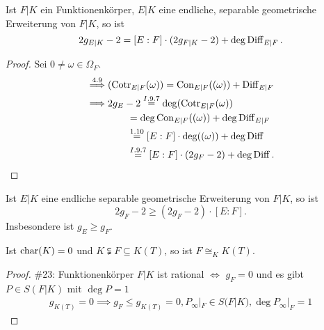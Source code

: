 \begin{theorem}
    Ist $F|K$ ein Funktionenkörper, $E|K$ eine endliche, separable geometrische Erweiterung von $F|K$, so ist
    $$ 2g_{E|K} - 2 = [E:F] \cdot (2g_{F|K} - 2) + \deg \operatorname{Diff}_{E|F}. $$
\end{theorem}
\begin{proof}
    Sei $0 \ne \omega \in \Omega_F$.
    \begin{align*}
        \stackrel{4.9}{\implies} & (\operatorname{Cotr}_{E|F}(\omega)) = \operatorname{Con}_{E|F}((\omega)) + \operatorname{Diff}_{E|F}\\
        \implies & 2g_E - 2 \stackrel{I.9.7}{=} \deg(\operatorname{Cotr}_{E|F}(\omega)) \\
        & \qquad = \deg \operatorname{Con}_{E|F}((\omega)) + \deg \operatorname{Diff}_{E|F}\\
        & \qquad \stackrel{1.10}{=} [E:F] \cdot \deg ((\omega)) + \deg \operatorname{Diff}\\
        & \qquad \stackrel{I.9.7}{=} [E:F] \cdot (2g_F - 2) + \deg \operatorname{Diff}.
    \end{align*}
\end{proof}

\begin{korollar}
    Ist $E|K$ eine endliche separable geometrische Erweiterung von $F|K$, so ist
    $$ 2g_F - 2 \geq (2g_F - 2)\cdot [E:F].$$
    Insbesondere ist $g_E \geq g_F$.
\end{korollar}

\begin{korollar}
    Ist $\operatorname{char}(K) = 0$ und $K \subsetneqq F \subseteq K(T)$, so ist $F \cong_K K(T)$.
\end{korollar}
\begin{proof}
    \#23: Funktionenkörper $F|K$ ist rational $\iff$ $g_F=0$ und es gibt $P \in S(F|K)$ mit $\deg P = 1$
    \begin{align*}
        g_{K(T)} = 0 \implies g_F \leq g_{K(T)} = 0, P_\infty|_F \in S(F|K), \deg P_\infty|_F = 1
    \end{align*}
\end{proof}